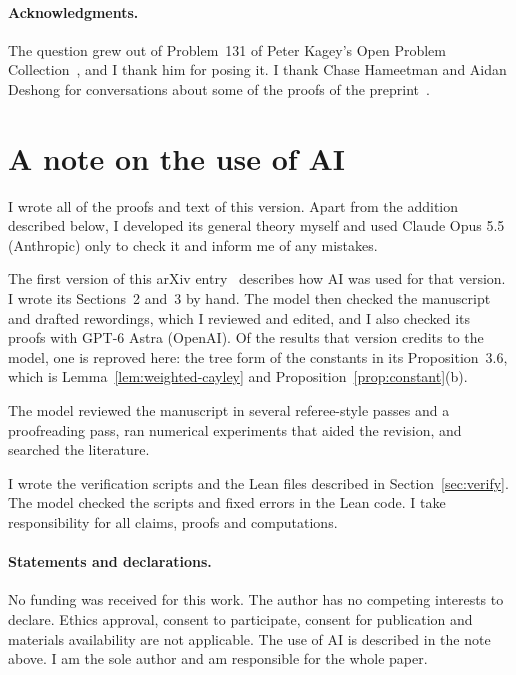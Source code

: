 \documentclass[11pt]{article}
\theoremstyle{definition}
\theoremstyle{remark}
\newif\ifarxivbuild
\newcommand{\Bversion}{\ifarxivbuild the first version\else the preprint\fi}
\begin{document}









\paragraph{Acknowledgments.} The question grew out of Problem~131 of Peter
Kagey's Open Problem Collection~\cite{kagey131}, and I thank him for posing it.
I thank Chase Hameetman and Aidan Deshong for conversations about some of the
proofs of \Bversion~\cite{paperB}.


\section*{A note on the use of AI}
I wrote all of the proofs and text of this version. Apart from the addition
described below, I developed its general theory myself and used Claude Opus 5.5
(Anthropic) only to check it and inform me of any mistakes.

The first version of this arXiv entry~\cite{paperB} describes how AI was used for
that version. I wrote its Sections~2 and~3 by hand. The model then checked the
manuscript and drafted rewordings, which I reviewed and edited, and I also checked
its proofs with GPT-6 Astra (OpenAI). Of the results that version credits to the
model, one is reproved here: the tree form of the constants in its
Proposition~3.6, which is Lemma~\ref{lem:weighted-cayley} and
Proposition~\ref{prop:constant}(b).

The model reviewed the manuscript in several referee-style
passes and a proofreading pass, ran numerical experiments that aided the
revision, and searched the literature.

I wrote the verification scripts and the Lean files described in
Section~\ref{sec:verify}. The model checked the scripts and fixed errors in the
Lean code. I take responsibility for all claims, proofs and computations.

\paragraph{Statements and declarations.} No funding was received for this work.
The author has no competing interests to declare. Ethics approval, consent to
participate, consent for publication and materials availability are not
applicable. The use of AI is described in the note above. I am the sole author and am
responsible for the whole paper.
\end{document}
